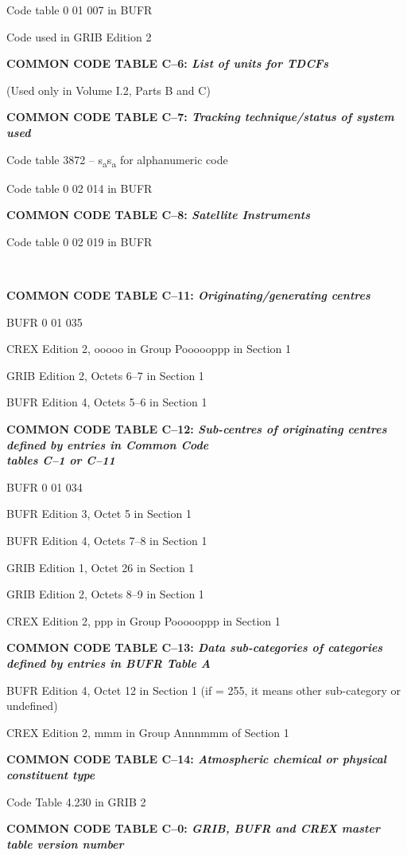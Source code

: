 Code table 0 01 007 in BUFR

Code used in GRIB Edition 2

\textbf{COMMON CODE TABLE C--6: \emph{List of units for TDCFs}}

(Used only in Volume I.2, Parts B and C)

\textbf{COMMON CODE TABLE C--7: \emph{Tracking technique/status of system used}}

Code table 3872 -- s\textsubscript{a}s\textsubscript{a} for alphanumeric code

Code table 0 02 014 in BUFR

\textbf{COMMON CODE TABLE C--8: \emph{Satellite Instruments}}

Code table 0 02 019 in BUFR

\textbf{\\
}

\textbf{COMMON CODE TABLE C--11: \emph{Originating/generating centres}}

BUFR 0 01 035

CREX Edition 2, ooooo in Group Poooooppp in Section 1

GRIB Edition 2, Octets 6--7 in Section 1

BUFR Edition 4, Octets 5--6 in Section 1

\textbf{COMMON CODE TABLE C--12: \emph{Sub-centres of originating centres defined by entries in Common Code\\
tables C--1 or C--11}}

BUFR 0 01 034

BUFR Edition 3, Octet 5 in Section 1

BUFR Edition 4, Octets 7--8 in Section 1

GRIB Edition 1, Octet 26 in Section 1

GRIB Edition 2, Octets 8--9 in Section 1

CREX Edition 2, ppp in Group Poooooppp in Section 1

\textbf{COMMON CODE TABLE C--13: \emph{Data sub-categories of categories defined by entries in BUFR Table A}}

BUFR Edition 4, Octet 12 in Section 1 (if = 255, it means other sub-category or undefined)

CREX Edition 2, mmm in Group Annnmmm of Section 1

\textbf{COMMON CODE TABLE C--14: \emph{Atmospheric chemical or physical constituent type}}

Code Table 4.230 in GRIB 2

\textbf{COMMON CODE TABLE C--0: \emph{GRIB, BUFR and CREX master table version number}}

